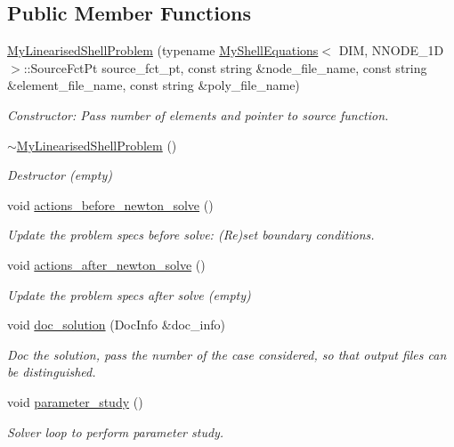 \subsection*{Public Member Functions}
\begin{DoxyCompactItemize}
\item 
\hyperlink{classMyLinearisedShellProblem_a2ccc4ed3e631ca68d1d86423ef8eeb03}{My\+Linearised\+Shell\+Problem} (typename \hyperlink{classoomph_1_1MyShellEquations}{My\+Shell\+Equations}$<$ D\+IM, N\+N\+O\+D\+E\+\_\+1D $>$\+::Source\+Fct\+Pt source\+\_\+fct\+\_\+pt, const string \&node\+\_\+file\+\_\+name, const string \&element\+\_\+file\+\_\+name, const string \&poly\+\_\+file\+\_\+name)
\begin{DoxyCompactList}\small\item\em Constructor\+: Pass number of elements and pointer to source function. \end{DoxyCompactList}\item 
\hyperlink{classMyLinearisedShellProblem_a8720e7226adb9f23266fe729f7e4eb5a}{$\sim$\+My\+Linearised\+Shell\+Problem} ()
\begin{DoxyCompactList}\small\item\em Destructor (empty) \end{DoxyCompactList}\item 
void \hyperlink{classMyLinearisedShellProblem_a81d050ee6958694b7645ea73cc8e4e9f}{actions\+\_\+before\+\_\+newton\+\_\+solve} ()
\begin{DoxyCompactList}\small\item\em Update the problem specs before solve\+: (Re)set boundary conditions. \end{DoxyCompactList}\item 
void \hyperlink{classMyLinearisedShellProblem_a8ad6606f22859a5bd32d238bcc10efd1}{actions\+\_\+after\+\_\+newton\+\_\+solve} ()
\begin{DoxyCompactList}\small\item\em Update the problem specs after solve (empty) \end{DoxyCompactList}\item 
void \hyperlink{classMyLinearisedShellProblem_a5894d8fae239fd5255b6a661cbc23fa5}{doc\+\_\+solution} (Doc\+Info \&doc\+\_\+info)
\begin{DoxyCompactList}\small\item\em Doc the solution, pass the number of the case considered, so that output files can be distinguished. \end{DoxyCompactList}\item 
void \hyperlink{classMyLinearisedShellProblem_ab9255e3cbaae69ad5d61757d891b633e}{parameter\+\_\+study} ()
\begin{DoxyCompactList}\small\item\em Solver loop to perform parameter study. \end{DoxyCompactList}\end{DoxyCompactItemize}
